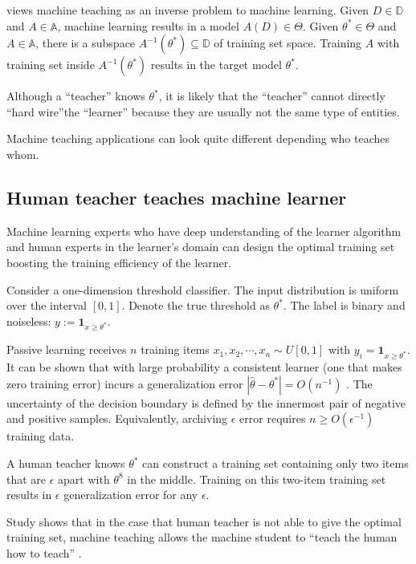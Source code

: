     \cite{Zhu2018} views machine teaching as an inverse problem to machine learning.
    Given $D \in \mathbb{D}$ and $A \in \mathbb{A}$, machine learning results in a model $A(D) \in \Theta$.
    Given $\theta^* \in \Theta$ and $A \in \mathbb{A}$,
    there is a subspace $A^{-1}(\theta^*) \subseteq \mathbb{D}$ of training set space. 
    Training $A$ with training set inside $A^{-1}(\theta^*)$ results in the target model $\theta^*$.

    Although a ``teacher'' knows $\theta^*$,
    it is likely that the ``teacher'' cannot directly ``hard wire''the ``learner''
    because they are usually not the same type of entities.

    Machine teaching applications can look quite different depending who teaches whom.

    \subsection{Human teacher teaches machine learner}

        Machine learning experts who have deep understanding of the learner algorithm
        and human experts in the learner's domain can design the optimal training set
        boosting the training efficiency of the learner.

        Consider a one-dimension threshold classifier.
        The input distribution is uniform over the interval $[0,1]$.
        Denote the true threshold as $\theta^*$.
        The label is binary and noiseless: $y := \bm{1}_{x \geq \theta^*}$.

        Passive learning receives $n$ training items
        $x_1, x_2, \cdots, x_n \sim U[0,1]$ with $y_i = \bm{1}_{x \geq \theta^*}$.
        It can be shown that with large probability a consistent learner (one that makes zero training error)
        incurs a generalization error $\left|\hat{\theta} - \theta^*\right| = O(n^{-1})$ \cite{Zhu2018}.
        The uncertainty of the decision boundary is defined by the innermost pair of negative and positive samples.
        Equivalently, archiving $\epsilon$ error requires $n \geq O(\epsilon^{-1})$ training data.

        A human teacher knows $\theta^*$ can construct a training set containing only two items
        that are $\epsilon$ apart with $\theta^8$ in the middle.
        Training on this two-item training set results in $\epsilon$ generalization error for any $\epsilon$.

        Study shows that in the case that human teacher is not able to give the optimal training set,
        machine teaching allows the machine student to ``teach the human how to teach'' \cite{Suh2016}.

